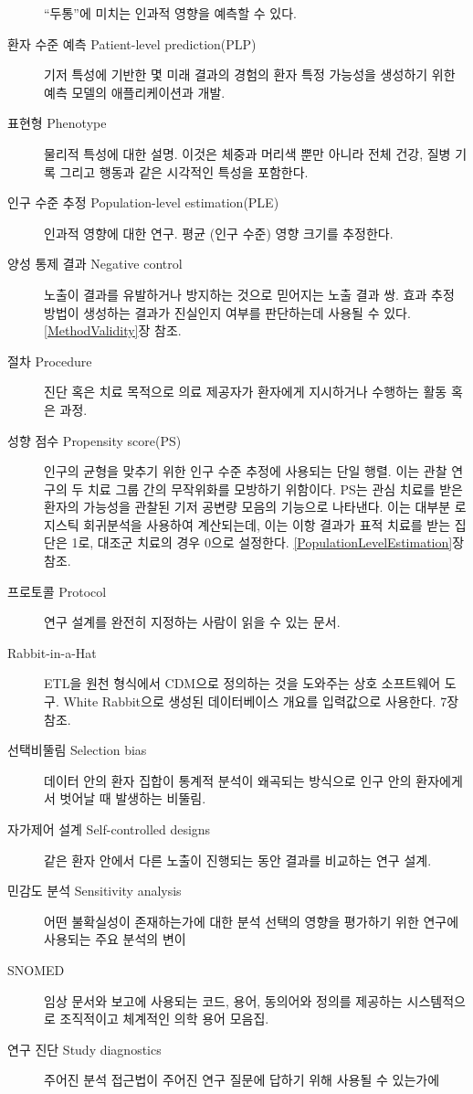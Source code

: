 \documentclass[10.5pt]{book}
\theoremstyle{definition}
\theoremstyle{definition}
\theoremstyle{definition}
\theoremstyle{remark}
\begin{document}
\begin{description}
``두통''에 미치는 인과적 영향을 예측할 수 있다.
\item[환자 수준 예측 Patient-level prediction(PLP)]
기저 특성에 기반한 몇 미래 결과의 경험의 환자 특정 가능성을 생성하기
위한 예측 모델의 애플리케이션과 개발.
\item[표현형 Phenotype]
물리적 특성에 대한 설명. 이것은 체중과 머리색 뿐만 아니라 전체 건강,
질병 기록 그리고 행동과 같은 시각적인 특성을 포함한다.
\item[인구 수준 추정 Population-level estimation(PLE)]
인과적 영향에 대한 연구. 평균 (인구 수준) 영향 크기를 추정한다.
\item[양성 통제 결과 Negative control]
노출이 결과를 유발하거나 방지하는 것으로 믿어지는 노출 결과 쌍. 효과
추정 방법이 생성하는 결과가 진실인지 여부를 판단하는데 사용될 수 있다.
\ref{MethodValidity}장 참조.
\item[절차 Procedure]
진단 혹은 치료 목적으로 의료 제공자가 환자에게 지시하거나 수행하는 활동
혹은 과정.
\item[성향 점수 Propensity score(PS)]
인구의 균형을 맞추기 위한 인구 수준 추정에 사용되는 단일 행렬. 이는 관찰
연구의 두 치료 그룹 간의 무작위화를 모방하기 위함이다. PS는 관심 치료를
받은 환자의 가능성을 관찰된 기저 공변량 모음의 기능으로 나타낸다. 이는
대부분 로지스틱 회귀분석을 사용하여 계산되는데, 이는 이항 결과가 표적
치료를 받는 집단은 1로, 대조군 치료의 경우 0으로 설정한다.
\ref{PopulationLevelEstimation}장 참조.
\item[프로토콜 Protocol]
연구 설계를 완전히 지정하는 사람이 읽을 수 있는 문서.
\item[Rabbit-in-a-Hat]
ETL을 원천 형식에서 CDM으로 정의하는 것을 도와주는 상호 소프트웨어 도구.
White Rabbit으로 생성된 데이터베이스 개요를 입력값으로 사용한다. 7장
참조.
\item[선택비뚤림 Selection bias]
데이터 안의 환자 집합이 통계적 분석이 왜곡되는 방식으로 인구 안의
환자에게서 벗어날 때 발생하는 비뚤림.
\item[자가제어 설계 Self-controlled designs]
같은 환자 안에서 다른 노출이 진행되는 동안 결과를 비교하는 연구 설계.
\item[민감도 분석 Sensitivity analysis]
어떤 불확실성이 존재하는가에 대한 분석 선택의 영향을 평가하기 위한
연구에 사용되는 주요 분석의 변이
\item[SNOMED]
임상 문서와 보고에 사용되는 코드, 용어, 동의어와 정의를 제공하는
시스템적으로 조직적이고 체계적인 의학 용어 모음집.
\item[연구 진단 Study diagnostics]
주어진 분석 접근법이 주어진 연구 질문에 답하기 위해 사용될 수 있는가에

\end{description}
\end{document}
